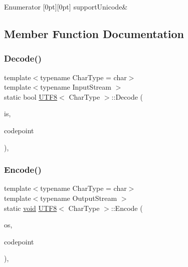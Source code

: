 \begin{DoxyEnumFields}{Enumerator}
[0pt][0pt]{}\mbox{\label{structUTF8_a414ff601aaf1d01a186a73493dca09a3a1a78b02dbcc9ddfd12f86a51cddf8fad}} 
support\+Unicode&\\
\hline

\end{DoxyEnumFields}


\subsection{Member Function Documentation}
\mbox{\label{structUTF8_a17c6badb31acf4f784111c886737fb17}} 
\subsubsection{\texorpdfstring{Decode()}{Decode()}}
{\footnotesize\ttfamily template$<$typename Char\+Type  = char$>$ \\
template$<$typename Input\+Stream $>$ \\
static bool \hyperlink{structUTF8}{U\+T\+F8}$<$ Char\+Type $>$\+::Decode (\begin{DoxyParamCaption}\item[{Input\+Stream \&}]{is,  }\item[{unsigned $\ast$}]{codepoint }\end{DoxyParamCaption})\hspace{0.3cm}{\ttfamily [inline]}, {\ttfamily [static]}}

\mbox{\label{structUTF8_af286ed19ca60d261a9b11b65bee1298b}} 
\subsubsection{\texorpdfstring{Encode()}{Encode()}}
{\footnotesize\ttfamily template$<$typename Char\+Type  = char$>$ \\
template$<$typename Output\+Stream $>$ \\
static \hyperlink{imgui__impl__opengl3__loader_8h_ac668e7cffd9e2e9cfee428b9b2f34fa7}{void} \hyperlink{structUTF8}{U\+T\+F8}$<$ Char\+Type $>$\+::Encode (\begin{DoxyParamCaption}\item[{Output\+Stream \&}]{os,  }\item[{unsigned}]{codepoint }\end{DoxyParamCaption})\hspace{0.3cm}{\ttfamily [inline]}, {\ttfamily [static]}}

